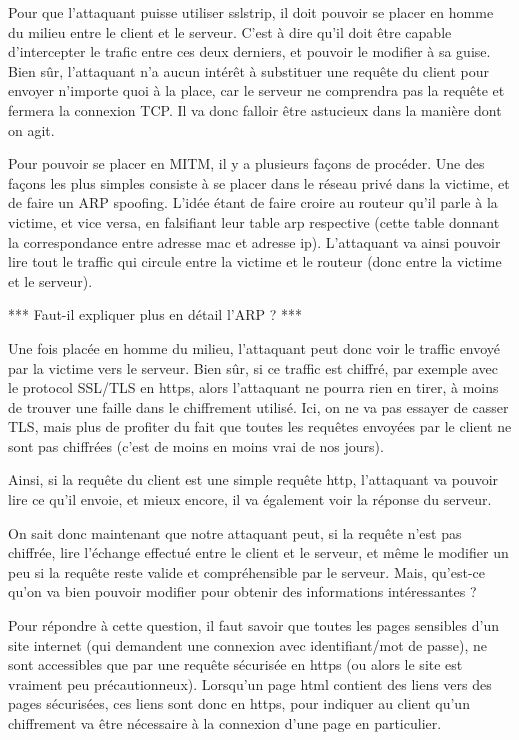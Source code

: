 Pour que l'attaquant puisse utiliser sslstrip, il doit pouvoir se placer en homme du milieu entre le client et le serveur. C'est à dire qu'il doit être capable d'intercepter le trafic entre ces deux derniers, et pouvoir le modifier à sa guise. Bien sûr, l'attaquant n'a aucun intérêt à substituer une requête du client pour envoyer n'importe quoi à la place, car le serveur ne comprendra pas la requête et fermera la connexion TCP. Il va donc falloir être astucieux dans la manière dont on agit.

Pour pouvoir se placer en MITM, il y a plusieurs façons de procéder. Une des façons les plus simples consiste à se placer dans le réseau privé dans la victime, et de faire un ARP spoofing. L'idée étant de faire croire au routeur qu'il parle à la victime, et vice versa, en falsifiant leur table arp respective (cette table donnant la correspondance entre adresse mac et adresse ip). L'attaquant va ainsi pouvoir lire tout le traffic qui circule entre la victime et le routeur (donc entre la victime et le serveur).

*** Faut-il expliquer plus en détail l'ARP ? ***

Une fois placée en homme du milieu, l'attaquant peut donc voir le traffic envoyé par la victime vers le serveur. Bien sûr, si ce traffic est chiffré, par exemple avec le protocol SSL/TLS en https, alors l'attaquant ne pourra rien en tirer, à moins de trouver une faille dans le chiffrement utilisé. Ici, on ne va pas essayer de casser TLS, mais plus de profiter du fait que toutes les requêtes envoyées par le client ne sont pas chiffrées (c'est de moins en moins vrai de nos jours).

Ainsi, si la requête du client est une simple requête http, l'attaquant va pouvoir lire ce qu'il envoie, et mieux encore, il va également voir la réponse du serveur.

On sait donc maintenant que notre attaquant peut, si la requête n'est pas chiffrée, lire l'échange effectué entre le client et le serveur, et même le modifier un peu si la requête reste valide et compréhensible par le serveur. Mais, qu'est-ce qu'on va bien pouvoir modifier pour obtenir des informations intéressantes ?

Pour répondre à cette question, il faut savoir que toutes les pages sensibles d'un site internet (qui demandent une connexion avec identifiant/mot de passe), ne sont accessibles que par une requête sécurisée en https (ou alors le site est vraiment peu précautionneux). Lorsqu'un page html contient des liens vers des pages sécurisées, ces liens sont donc en https, pour indiquer au client qu'un chiffrement va être nécessaire à la connexion d'une page en particulier.


